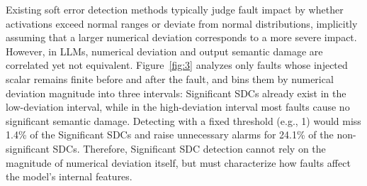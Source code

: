Existing soft error detection methods typically judge fault impact by whether activations exceed normal ranges or deviate from normal distributions, implicitly assuming that a larger numerical deviation corresponds to a more severe impact. However, in LLMs, numerical deviation and output semantic damage are correlated yet not equivalent. Figure~\ref{fig:3} analyzes only faults whose injected scalar remains finite before and after the fault, and bins them by numerical deviation magnitude into three intervals: Significant SDCs already exist in the low-deviation interval, while in the high-deviation interval most faults cause no significant semantic damage. Detecting with a fixed threshold (e.g., 1) would miss 1.4\% of the Significant SDCs and raise unnecessary alarms for 24.1\% of the non-significant SDCs. Therefore, Significant SDC detection cannot rely on the magnitude of numerical deviation itself, but must characterize how faults affect the model's internal features.


